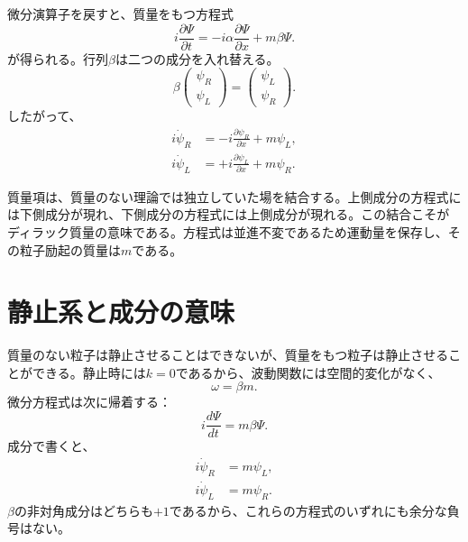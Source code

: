 微分演算子を戻すと、質量をもつ方程式
\begin{equation}
i\frac{\partial\Psi}{\partial t}
=
-i\alpha\frac{\partial\Psi}{\partial x}
+m\beta\Psi.
\end{equation}
が得られる。行列\(\beta\)は二つの成分を入れ替える。
\begin{equation}
\beta
\begin{pmatrix}
\psi_R\\
\psi_L
\end{pmatrix}
=
\begin{pmatrix}
\psi_L\\
\psi_R
\end{pmatrix}.
\end{equation}
したがって、
\begin{align}
i\dot{\psi}_R
&=-i\frac{\partial\psi_R}{\partial x}+m\psi_L,\\
i\dot{\psi}_L
&=+i\frac{\partial\psi_L}{\partial x}+m\psi_R.
\end{align}

質量項は、質量のない理論では独立していた場を結合する。上側成分の方程式には下側成分が現れ、下側成分の方程式には上側成分が現れる。この結合こそがディラック質量の意味である。方程式は並進不変であるため運動量を保存し、その粒子励起の質量は\(m\)である。

\begin{classroomqa}
\end{classroomqa}

\section{静止系と成分の意味}

質量のない粒子は静止させることはできないが、質量をもつ粒子は静止させることができる。静止時には\(k=0\)であるから、波動関数には空間的変化がなく、
\begin{equation}
\omega=\beta m.
\end{equation}
微分方程式は次に帰着する：
\begin{equation}
i\frac{d\Psi}{dt}=m\beta\Psi.
\end{equation}
成分で書くと、
\begin{align}
i\dot{\psi}_R&=m\psi_L,\\
i\dot{\psi}_L&=m\psi_R.
\end{align}
\(\beta\)の非対角成分はどちらも\(+1\)であるから、これらの方程式のいずれにも余分な負号はない。

